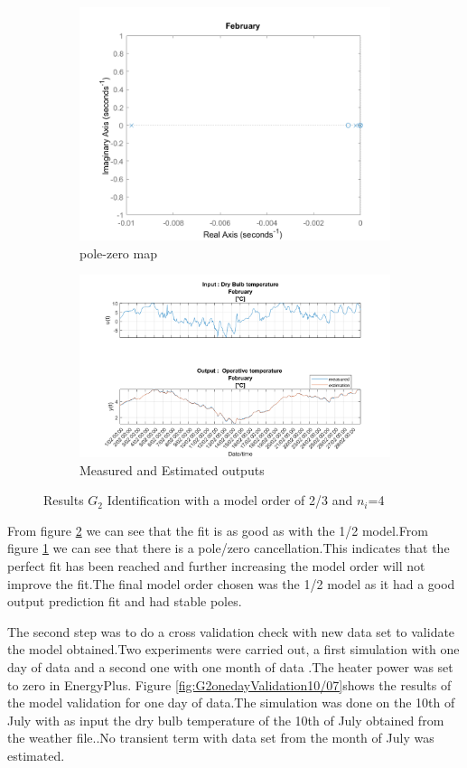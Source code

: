 \documentclass[a4paper,12pt]{report}
\numberwithin{equation}{section}
\begin{document}
\begin{figure}[H]
\centering
\begin{subfigure}{\textwidth}
  \centering
  \includegraphics[width=.6\linewidth]{G2mod23pzmap.png}
  \caption{pole-zero map}
  \label{fig:pzmap G2mod2/3}
\end{subfigure}

\begin{subfigure}{\textwidth}
  \centering
  \includegraphics[width=.8\linewidth]{G2mod23InOut.png}
  \caption{Measured and Estimated outputs}
  \label{fig:inoutG22/3}
\end{subfigure}
\caption{Results $G_{2}$ Identification with a model order of 2/3 and $n_{i}$=4 }
\label{fig:G2mod2/3}
\end{figure}

\noindent
From figure \ref{fig:inoutG22/3} we can see that the fit is as good as with the 1/2 model.From figure \ref{fig:pzmap G2mod2/3} we can see that there is a pole/zero cancellation.This indicates that the perfect fit has been reached and further increasing the model order will not improve the fit.The final model order chosen was the 1/2 model as it had a good  output prediction fit and had stable poles.

The second step was to do a cross validation check with new data set to validate the model obtained.Two  experiments were carried out, a first simulation with one day of data and a second one with one month of data .The heater power was set to zero in  EnergyPlus. Figure \ref{fig:G2onedayValidation10/07}shows the results of the model validation for one day of data.The simulation was done on the 10th of July with as input the dry bulb temperature of the 10th of July obtained from the weather file..No transient term with data set from the month of July was estimated.
\end{document}
